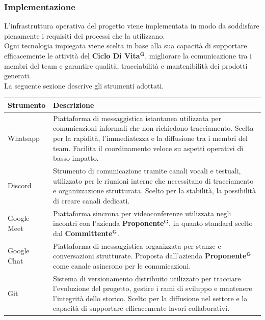 \documentclass[a4paper,12pt]{article}
\newcommand{\term}[1]{\textbf{#1}$^\mathbf{G}$}
\begin{document}
\subsubsection{Implementazione}
L’infrastruttura operativa del progetto viene implementata in modo da soddisfare pienamente i requisiti dei processi che la utilizzano.\\ Ogni tecnologia impiegata viene scelta in base alla sua capacità di supportare efficacemente le attività del \term{Ciclo Di Vita}, migliorare la comunicazione tra i membri del team e garantire qualità, tracciabilità e mantenibilità dei prodotti generati.\\La seguente sezione descrive gli strumenti adottati.
\begin{center}
\small
{} 
\begin{longtable}{| m{3cm} | m{} |}
\hline
\rowcolor{gray!60}
{\centering \textbf{Strumento}\par} &
{\centering \textbf{Descrizione}\par} \\
\hline
\rowcolor{white}
\centering Whatsapp & Piattaforma di messaggistica istantanea utilizzata per comunicazioni informali che non richiedono tracciamento. Scelta per la rapidità, l’immediatezza e la diffusione tra i membri del team. Facilita il coordinamento veloce su aspetti operativi di basso impatto.\\
\hline
\rowcolor{gray!20}
\centering Discord & Strumento di comunicazione tramite canali vocali e testuali, utilizzato per le riunioni interne che necessitano di tracciamento e organizzazione strutturata. Scelto per la stabilità, la possibilità di creare canali dedicati.\\
\hline
\rowcolor{white}
\centering Google Meet & Piattaforma sincrona per videoconferenze utilizzata negli incontri con l’azienda \term{Proponente}, in quanto standard scelto dal \term{Committente}.\\
\hline
\rowcolor{gray!20}
\centering Google Chat & Piattaforma di messaggistica organizzata per stanze e conversazioni strutturate. Proposta dall'azienda \term{Proponente} come canale asincrono per le comunicazioni.\\
\hline
\rowcolor{white}
\centering Git & Sistema di versionamento distribuito utilizzato per tracciare l’evoluzione del progetto, gestire i rami di sviluppo e mantenere l’integrità dello storico. Scelto per la diffusione nel settore e la capacità di supportare efficacemente lavori collaborativi.\\

\end{longtable}
\end{center}
\end{document}
